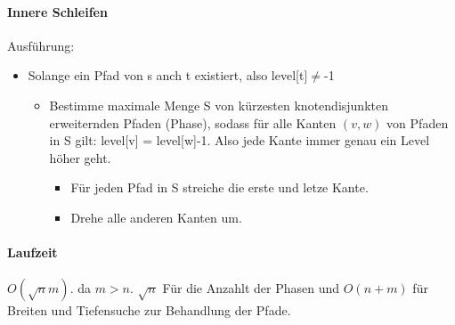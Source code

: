 \newpage
\paragraph{Innere Schleifen} Ausführung:
\begin{itemize}
    \item[] Solange ein Pfad von s anch t existiert, also level[t]$ \neq $-1
    \begin{itemize}
        \item[] Bestimme maximale Menge S von kürzesten knotendisjunkten erweiternden Pfaden (Phase), sodass für alle Kanten $ (v,w) $ von Pfaden in S gilt: level[v] = level[w]-1. Also jede Kante immer genau ein Level höher geht.
        \begin{itemize}
            \item Für jeden Pfad in S streiche die erste und letze Kante.
            \item Drehe alle anderen Kanten um.
        \end{itemize}
    \end{itemize}
\end{itemize}

\paragraph{Laufzeit}
$ O(\sqrt{n} m) $. da $ m > n $. $ \sqrt{n} $ Für die Anzahlt der Phasen und $ O(n+m) $ für Breiten und Tiefensuche zur Behandlung der Pfade.



